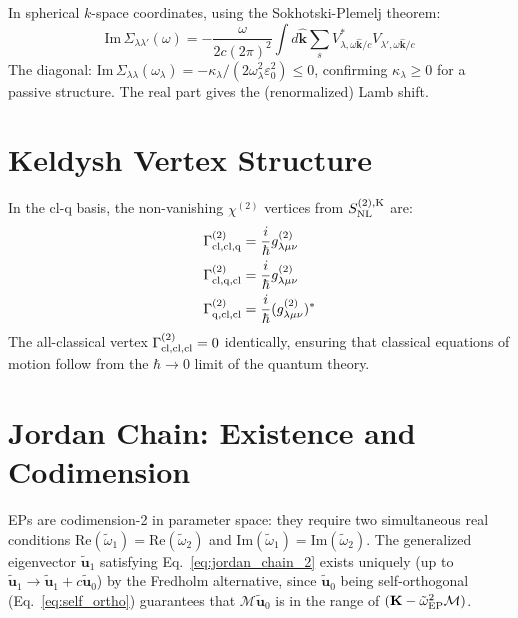 \documentclass[12pt]{article}
\newcommand{\NL}{{\rm NL}}
\newcommand{\cl}{{\rm cl}}
\newcommand{\q}{{\rm q}}
\newcommand{\Keldysh}{{\rm K}}
\newcommand{\EP}{{\rm EP}}
\newcommand{\tu}{\tilde{\mathbf{u}}}
\newcommand{\tomega}{\tilde{\omega}}
\begin{document}
In spherical $k$-space coordinates, using the Sokhotski-Plemelj theorem:
\begin{equation}
  \mathrm{Im}\,\Sigma_{\lambda\lambda'}(\omega) =
  -\frac{\omega}{2c(2\pi)^2}\int d\hat{\mathbf{k}}\sum_s
  V_{\lambda,\omega\hat{\mathbf{k}}/c}^*V_{\lambda',\omega\hat{\mathbf{k}}/c}
\end{equation}
The diagonal:
$\mathrm{Im}\,\Sigma_{\lambda\lambda}(\omega_\lambda)
=-\kappa_\lambda/(2\omega_\lambda^2\varepsilon_0^2)\leq 0$,
confirming $\kappa_\lambda\geq 0$ for a passive structure.
The real part gives the (renormalized) Lamb shift.

\section{Keldysh Vertex Structure}
\label{app:vertices}

In the cl-q basis, the non-vanishing $\chi^{(2)}$ vertices from
$S_\NL^{(2),\Keldysh}$ are:
\begin{align}
  \Gamma^{(2)}_{\cl,\cl,\q} &= \frac{i}{\hbar}g^{(2)}_{\lambda\mu\nu}\\
  \Gamma^{(2)}_{\cl,\q,\cl} &= \frac{i}{\hbar}g^{(2)}_{\lambda\mu\nu}\\
  \Gamma^{(2)}_{\q,\cl,\cl} &= \frac{i}{\hbar}(g^{(2)}_{\lambda\mu\nu})^*
\end{align}
The all-classical vertex $\Gamma^{(2)}_{\cl,\cl,\cl}=0$ identically,
ensuring that classical equations of motion follow from the
$\hbar\to 0$ limit of the quantum theory.

\section{Jordan Chain: Existence and Codimension}
\label{app:ep_existence}

EPs are codimension-2 in parameter space: they require two simultaneous
real conditions $\mathrm{Re}(\tomega_1)=\mathrm{Re}(\tomega_2)$ and
$\mathrm{Im}(\tomega_1)=\mathrm{Im}(\tomega_2)$.  The generalized
eigenvector $\tu_1$ satisfying Eq.~\eqref{eq:jordan_chain_2} exists
uniquely (up to $\tu_1\to\tu_1+c\tu_0$) by the Fredholm alternative,
since $\tu_0$ being self-orthogonal (Eq.~\ref{eq:self_ortho}) guarantees
that $\mathcal{M}\tu_0$ is in the range of
$(\mathbf{K}-\tomega_\EP^2\mathcal{M})$.
\end{document}
